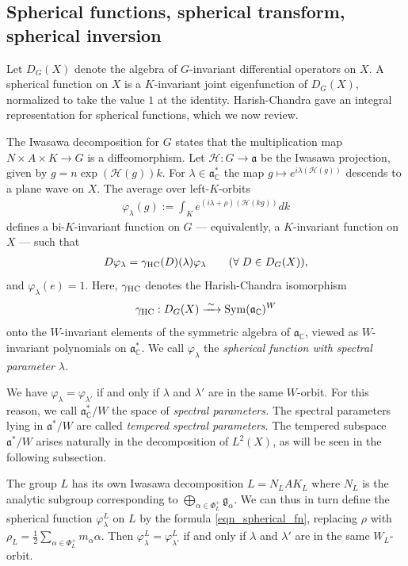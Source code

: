 \documentclass[12pt]{amsart}
\theoremstyle{remark}
\newcommand{\ga}{\mathfrak a}
\begin{document}
\subsection{Spherical functions, spherical transform, spherical inversion}\label{subsec:sph-fn}

Let $D_{G}(X)$ denote the algebra of $G$-invariant differential operators on $X$. A spherical function on $X$ is a $K$-invariant joint eigenfunction of $D_{G}(X)$, normalized to take the value $1$ at the identity. Harish-Chandra gave an integral representation for spherical functions, which we now review.

The Iwasawa decomposition for $G$ states that the multiplication map $N \times A \times K\rightarrow G$ is a diffeomorphism. Let $\mathcal{H}: G \to \ga$ be the Iwasawa projection, given by $g = n\exp(\mathcal{H}(g))k$. For $\lambda \in \ga^*_{\mathbb{C}}$ the map $g\mapsto e^{i\lambda(\mathcal{H}(g))}$ descends to a plane wave on $X$. The average over left-$K$-orbits
\begin{gather}\label{eqn_spherical_fn}
    \varphi_{\lambda}(g) := \int_K e^{(i\lambda + \rho) (\mathcal{H}(k g))} dk
\end{gather}
defines a bi-$K$-invariant function on $G$ --- equivalently, a $K$-invariant function on $X$ --- such that
\begin{gather*}
D \varphi_{\lambda} = \gamma_{\rm HC}(D)(\lambda) \varphi_{\lambda} \qquad (\forall\; D\in D_G(X)),
\end{gather*}
and $\varphi_{\lambda}(e) =1$. Here, $\gamma_{\rm HC}$ denotes the Harish-Chandra isomorphism
\begin{gather*}
    \gamma_{\rm HC}: D_{G}(X) \xrightarrow{\;\sim\;} \mathrm{Sym}(\ga_{\mathbb{C}})^W
\end{gather*}
onto the $W$-invariant elements of the symmetric algebra of $\ga_{\mathbb{C}}$, viewed as $W$-invariant polynomials on $\ga^*_{\mathbb{C}}$. We call $\varphi_{\lambda}$ the \textit{spherical function with spectral parameter $\lambda$.}

We have $\varphi_{\lambda} = \varphi_{\lambda'}$ if and only if $\lambda$ and $\lambda'$ are in the same $W$-orbit. For this reason, we call $\ga^*_{\mathbb{C}}/W$ the space of \textit{spectral parameters.} The spectral parameters lying in $\ga^*/W$ are called \textit{tempered spectral parameters}. The tempered subspace $\ga^*/W$ arises naturally in the decomposition of $L^2(X)$, as will be seen in the following subsection.

The group $L$ has its own Iwasawa decomposition $L = N_L A K_L  $ where $N_L$ is the analytic subgroup corresponding to $\bigoplus_{\alpha \in \Phi_L^+} \mathfrak{g}_\alpha$. We can thus in turn define the spherical function $\varphi_\lambda^L$ on $L$ by the formula \eqref{eqn_spherical_fn}, replacing $\rho$ with $\rho_L = \frac{1}{2} \sum_{\alpha \in \Phi_L^+} m_\alpha \alpha$. Then $\varphi_{\lambda}^L = \varphi_{\lambda'}^L$ if and only if $\lambda$ and $\lambda'$ are in the same $W_L$-orbit. 
\end{document}
